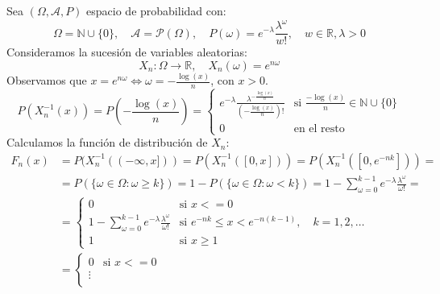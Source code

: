 \begin{exercise}
    Sea $(\Omega, \mathcal{A}, P)$ espacio de probabilidad con:
    $$\Omega = \mathbb{N} \cup \{0\}, \quad \mathcal{A} = \mathcal{P}(\Omega), \quad P(\omega) = e^{-\lambda} \frac{\lambda^\omega}{w!}, \quad w \in \mathbb{R}, \lambda > 0$$
    Consideramos la sucesión de variables aleatorias:
    $$X_n: \Omega \to \mathbb{R}, \quad X_n(\omega) = e^{n\omega}$$
    Observamos que $x = e^{n\omega} \Leftrightarrow \omega = -\frac{\log(x)}{n}$, con $x > 0$.
    $$P(X_n^{-1}(x)) = P\left(-\frac{\log(x)}{n}\right) = \begin{cases}
            e^{-\lambda} \frac{\lambda^{-\frac{\log(x)}{n}}}{\left(-\frac{\log(x)}{n}\right)!} & \text{si } \frac{-\log(x)}{n} \in \mathbb{N} \cup \{0\} \\
            0                                                                                  & \text{en el resto}
        \end{cases}$$
    Calculamos la función de distribución de $X_n$:
    \begin{align*}
        F_n(x) & = P(X_n^{-1}((-\infty,x])) = P(X_n^{-1}([0,x])) = P(X_n^{-1}([0,e^{-nk}])) =                                                                                        \\
               & = P(\{ \omega \in \Omega : \omega \geq k \}) = 1 - P(\{ \omega \in \Omega : \omega < k \}) = 1 - \sum_{\omega=0}^{k-1} e^{-\lambda}\frac{\lambda^\omega}{\omega!} = \\
               & = \begin{cases}
                       0                                                                    & \text{si } x <= 0                                              \\
                       1 - \sum_{\omega=0}^{k-1} e^{-\lambda}\frac{\lambda^\omega}{\omega!} & \text{si } e^{-nk} \leq x < e^{-n(k-1)}, \quad k = 1, 2, \dots \\
                       1                                                                    & \text{si } x \geq 1
                   \end{cases}                             \\
               & = \begin{cases}
                       0                           & \text{si } x <= 0                  \\
                       \vdots                                                           \\

\end{cases}
\end{align*}
\end{exercise}
